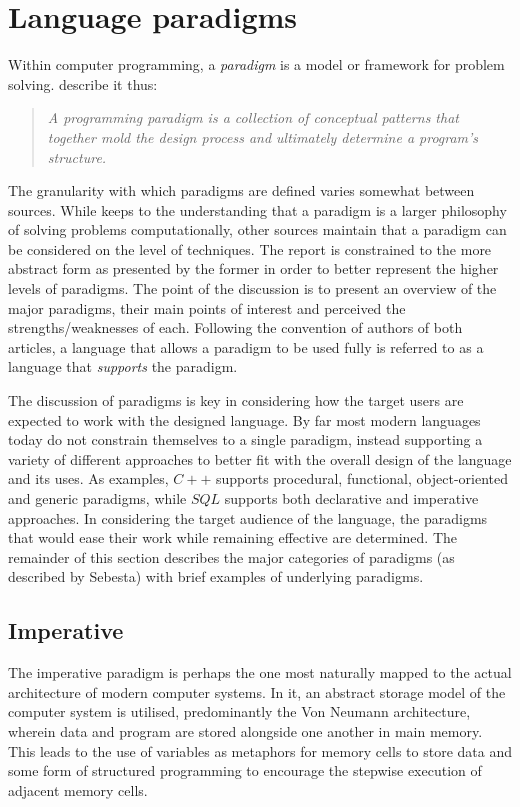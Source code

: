 \section{Language paradigms}
Within computer programming, a \emph{paradigm} is a model or framework for problem solving. \citeauthor{paradigms1992} describe it thus:

\begin{quote}
\emph{A programming paradigm is a collection of conceptual patterns that together mold the design process and ultimately determine a program's structure.}
\end{quote}

The granularity with which paradigms are defined varies somewhat between sources. While \citeauthor{paradigms1992} keeps to the understanding that a paradigm is a larger philosophy of solving problems computationally, other sources maintain that a paradigm can be considered on the level of techniques\cite{paradigms1978}. The report is constrained to the more abstract form as presented by the former in order to better represent the higher levels of paradigms. The point of the discussion is to present an overview of the major paradigms, their main points of interest and perceived the strengths/weaknesses of each. Following the convention of authors of both articles, a language that allows a paradigm to be used fully is referred to as a language that \emph{supports} the paradigm.

The discussion of paradigms is key in considering how the target users are expected to work with the designed language. By far most modern languages today do not constrain themselves to a single paradigm, instead supporting a variety of different approaches to better fit with the overall design of the language and its uses. As examples, $C++$ supports procedural, functional, object-oriented and generic paradigms, while $SQL$ supports both declarative and imperative approaches. In considering the target audience of the language, the paradigms that would ease their work while remaining effective are determined. The remainder of this section describes the major categories of paradigms (as described by Sebesta\cite{concepts_prog_lang}) with brief examples of underlying paradigms.

\subsection{Imperative}
The imperative paradigm is perhaps the one most naturally mapped to the actual architecture of modern computer systems. In it, an abstract storage model of the computer system is utilised, predominantly the Von Neumann architecture, wherein data and program are stored alongside one another in main memory. This leads to the use of variables as metaphors for memory cells to store data and some form of structured programming to encourage the stepwise execution of adjacent memory cells.

